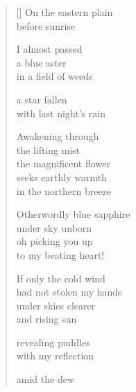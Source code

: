 \documentclass[12pt,a4paper]{article}
\begin{document}
\thispagestyle{empty}

\poemtitle{}

\settowidth{\versewidth}{Otherwordly blue sapphire}

\bigskip

\begin{verse}[\versewidth]
  On the eastern plain \\
  before sunrise

  I almost passed \\
  a blue aster \\
  in a field of weeds

  a star fallen \\
  with last night's rain

  Awakening through \\
  the lifting mist \\
  the magnificent flower \\
  seeks earthly warmth \\
  in the northern breeze

  Otherwordly blue sapphire \\
  under sky unborn \\
  oh picking you up \\
  to my beating heart!

  If only the cold wind \\
  had not stolen my hands \\
  under skies clearer \\
  and rising sun

  revealing puddles \\
  with my reflection

  amid the dew
\end{verse}
\end{document}
